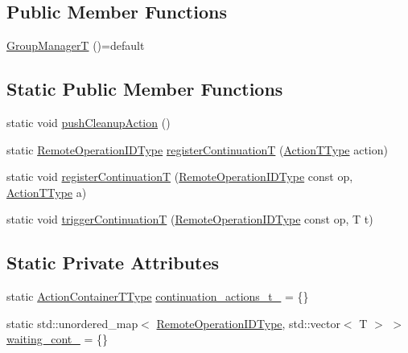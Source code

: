 \subsection*{Public Member Functions}
\begin{DoxyCompactItemize}
\item 
\hyperlink{structvt_1_1group_1_1_group_manager_t_a751380e18149d43fefffd79d22d96ebc}{Group\+ManagerT} ()=default
\end{DoxyCompactItemize}
\subsection*{Static Public Member Functions}
\begin{DoxyCompactItemize}
\item 
static void \hyperlink{structvt_1_1group_1_1_group_manager_t_ad149f3bfcb76761f22283a1bf6b147d0}{push\+Cleanup\+Action} ()
\item 
static \hyperlink{namespacevt_1_1group_a73f2624ddeb535b39a08b6524f26b244}{Remote\+Operation\+I\+D\+Type} \hyperlink{structvt_1_1group_1_1_group_manager_t_aa52eafbcdd4d1e8da4f17ef4cd03098a}{register\+ContinuationT} (\hyperlink{structvt_1_1group_1_1_group_manager_t_acb20922687d3165d97de391fdbaf02ca}{Action\+T\+Type} action)
\item 
static void \hyperlink{structvt_1_1group_1_1_group_manager_t_a7cc0fcbe3319335031839ed50590be16}{register\+ContinuationT} (\hyperlink{namespacevt_1_1group_a73f2624ddeb535b39a08b6524f26b244}{Remote\+Operation\+I\+D\+Type} const op, \hyperlink{structvt_1_1group_1_1_group_manager_t_acb20922687d3165d97de391fdbaf02ca}{Action\+T\+Type} a)
\item 
static void \hyperlink{structvt_1_1group_1_1_group_manager_t_aae5c5918bcdd2add07289c8f5eec1cc8}{trigger\+ContinuationT} (\hyperlink{namespacevt_1_1group_a73f2624ddeb535b39a08b6524f26b244}{Remote\+Operation\+I\+D\+Type} const op, T t)
\end{DoxyCompactItemize}
\subsection*{Static Private Attributes}
\begin{DoxyCompactItemize}
\item 
static \hyperlink{structvt_1_1group_1_1_group_manager_t_adc0d6d680c4f8bdbb80cd90f84a5f7ee}{Action\+Container\+T\+Type} \hyperlink{structvt_1_1group_1_1_group_manager_t_ace6828eddb4d595c12ea5c07047207d6}{continuation\+\_\+actions\+\_\+t\+\_\+} = \{\}
\item 
static std\+::unordered\+\_\+map$<$ \hyperlink{namespacevt_1_1group_a73f2624ddeb535b39a08b6524f26b244}{Remote\+Operation\+I\+D\+Type}, std\+::vector$<$ T $>$ $>$ \hyperlink{structvt_1_1group_1_1_group_manager_t_a294adcb4f4b41892733f29b9dea70f9e}{waiting\+\_\+cont\+\_\+} = \{\}
\end{DoxyCompactItemize}
